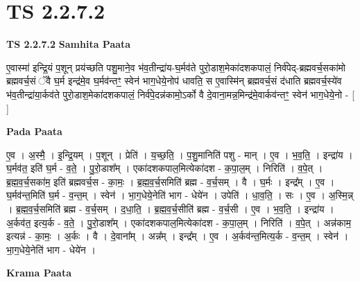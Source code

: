 \documentclass[17pt]{extarticle}
\begin{document}
\section*{ TS 2.2.7.2 }

\textbf{TS 2.2.7.2 } \newline
\textbf{Samhita Paata} \newline

ए॒वास्मा॑ इन्द्रि॒यं प॒शून् प्रय॑च्छति पशु॒माने॒व भ॑व॒तीन्द्रा॑य-घ॒र्मव॑ते पुरो॒डाश॒मेका॑दशकपालं॒ निर्व॑पेद्-ब्रह्मवर्च॒सका॑मो ब्रह्मवर्च॒सं ॅवै घ॒र्म इन्द्र॑मे॒व घ॒र्मव॑न्तꣳ॒॒ स्वेन॑ भाग॒धेये॒नोप॑ धावति॒ स ए॒वास्मि॑न् ब्रह्मवर्च॒सं द॑धाति ब्रह्मवर्च॒स्ये॑व भ॑व॒तीन्द्रा॑या॒र्कव॑ते पुरो॒डाश॒मेका॑दशकपालं॒ निर्व॑पे॒दन्न॑कामो॒ऽर्को वै दे॒वाना॒मन्न॒मिन्द्र॑मे॒वार्कव॑न्तꣳ॒॒ स्वेन॑ भाग॒धेये॒नो - [  ] \newline

\textbf{Pada Paata} \newline

ए॒व । अ॒स्मै॒ । इ॒न्द्रि॒यम् । प॒शून् । प्रेति॑ । य॒च्छ॒ति॒ । प॒शु॒मानिति॑ पशु - मान् । ए॒व । भ॒व॒ति॒ । इन्द्रा॑य । घ॒र्मव॑त॒ इति॑ घ॒र्म - व॒ते॒ । पु॒रो॒डाश᳚म् । एका॑दशकपाल॒मित्येका॑दश - क॒पा॒ल॒म् । निरिति॑ । व॒पे॒त् । ब्र॒ह्म॒व॒र्च॒सका॑म॒ इति॑ ब्रह्मवर्च॒स - का॒मः॒ । ब्र॒ह्म॒व॒र्च॒समिति॑ ब्रह्म - व॒र्च॒सम् । वै । घ॒र्मः । इन्द्र᳚म् । ए॒व । घ॒र्मव॑न्त॒मिति॑ घ॒र्म - व॒न्त॒म् । स्वेन॑ । भा॒ग॒धेये॒नेति॑ भाग - धेये॑न । उपेति॑ । धा॒व॒ति॒ । सः । ए॒व । अ॒स्मि॒न्न् । ब्र॒ह्म॒व॒र्च॒समिति॑ ब्रह्म - व॒र्च॒सम् । द॒धा॒ति॒ । ब्र॒ह्म॒व॒र्च॒सीति॑ ब्रह्म - व॒र्च॒सी । ए॒व । भ॒व॒ति॒ । इन्द्रा॑य । अ॒र्कव॑त॒ इत्य॒र्क - व॒ते॒ । पु॒रो॒डाश᳚म् । एका॑दशकपाल॒मित्येका॑दश - क॒पा॒ल॒म् । निरिति॑ । व॒पे॒त् । अन्न॑काम॒ इत्यन्न॑ - का॒मः॒ । अ॒र्कः । वै । दे॒वाना᳚म् । अन्न᳚म् । इन्द्र᳚म् । ए॒व । अ॒र्कव॑न्त॒मित्य॒र्क - व॒न्त॒म् । स्वेन॑ । भा॒ग॒धेये॒नेति॑ भाग - धेये॑न ।  \newline


\textbf{Krama Paata} \newline
\end{document}
